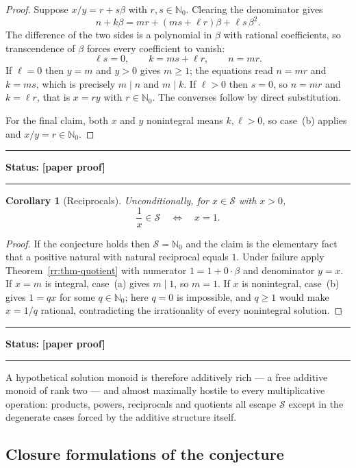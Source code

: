 \documentclass[11pt,oneside]{article}
\newtheorem{corollary}[theorem]{Corollary}
\theoremstyle{definition}
\theoremstyle{remark}
\newcommand{\Nzero}{\mathbb N_0}
\newcommand{\Sol}{\mathcal S}
\newcommand{\statusnew}{\textcolor{newgreen}{\textbf{[paper proof]}}}
\newenvironment{statusbox}[1]
{\begin{center}\begin{minipage}{0.94\textwidth}\raggedright\hbadness=10000\hrule
\vspace{0.45em}\textbf{Status:} #1\par\vspace{0.35em}}
{\vspace{0.35em}\hrule\end{minipage}\end{center}}
\begin{document}
\begin{proof}
Suppose $x/y=r+s\beta$ with $r,s\in\Nzero$.  Clearing the denominator gives
\[
 n+k\beta
 =mr+(ms+\ell r)\beta+\ell s\,\beta^2 .
\]
The difference of the two sides is a polynomial in $\beta$ with rational coefficients, so
transcendence of $\beta$ forces every coefficient to vanish:
\[
 \ell s=0,
 \qquad
 k=ms+\ell r,
 \qquad
 n=mr .
\]
If $\ell=0$ then $y=m$ and $y>0$ gives $m\ge1$; the equations read $n=mr$ and $k=ms$, which
is precisely $m\mid n$ and $m\mid k$.  If $\ell>0$ then $s=0$, so $n=mr$ and $k=\ell r$, that
is $x=ry$ with $r\in\Nzero$.  The converses follow by direct substitution.

For the final claim, both $x$ and $y$ nonintegral means $k,\ell>0$, so case~(b) applies and
$x/y=r\in\Nzero$.
\end{proof}

\begin{statusbox}{\statusnew}
\end{statusbox}

\begin{corollary}[Reciprocals]
\label{rr:cor-reciprocal}
Unconditionally, for $x\in\Sol$ with $x>0$,
\[
 \frac1x\in\Sol
 \quad\Longleftrightarrow\quad
 x=1 .
\]
\end{corollary}

\begin{proof}
If the conjecture holds then $\Sol=\Nzero$ and the claim is the elementary fact that a
positive natural with natural reciprocal equals $1$.  Under failure apply
Theorem~\ref{rr:thm-quotient} with numerator $1=1+0\cdot\beta$ and denominator $y=x$.  If
$x=m$ is integral, case~(a) gives $m\mid1$, so $m=1$.  If $x$ is nonintegral, case~(b) gives
$1=qx$ for some $q\in\Nzero$; here $q=0$ is impossible, and $q\ge1$ would make $x=1/q$
rational, contradicting the irrationality of every nonintegral solution.
\end{proof}

\begin{statusbox}{\statusnew}
\end{statusbox}

A hypothetical solution monoid is therefore additively rich --- a free additive monoid of
rank two --- and almost maximally hostile to every multiplicative operation: products,
powers, reciprocals and quotients all escape $\Sol$ except in the degenerate cases forced by
the additive structure itself.

\subsection{Closure formulations of the conjecture}
\end{document}
